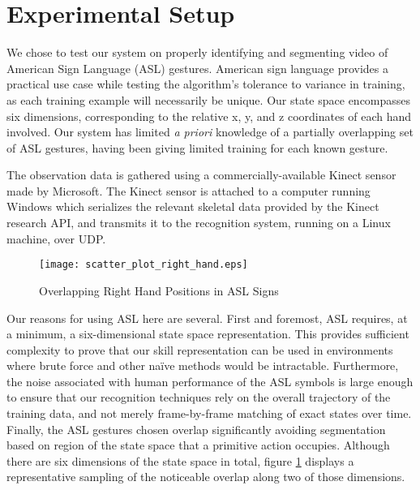 \documentclass[letterpaper]{article}
\begin{document}
\section{Experimental Setup}
\label{sec:experiment}
We chose to test our system on properly identifying and segmenting video of American Sign Language (ASL) gestures. American sign language provides a practical use case while testing the algorithm's tolerance to variance in training, as each training example will necessarily be unique. Our state space encompasses six dimensions, corresponding to the relative x, y, and z coordinates of each hand involved.  Our system has limited \textit{a priori} knowledge of a partially overlapping set of ASL gestures, having been giving limited training for each known gesture.

The observation data is gathered using a commercially-available Kinect sensor made by Microsoft.  The Kinect sensor is attached to a computer running Windows which serializes the relevant skeletal data provided by the Kinect research API, and transmits it to the recognition system, running on a Linux machine, over UDP.  

\begin{figure}
\begin{center}
\texttt{[image: scatter\_plot\_right\_hand.eps]}
\caption{Overlapping Right Hand Positions in ASL Signs}
\label{fig:asl_sign_overlap}
\end{center}
\end{figure}

Our reasons for using ASL here are several.  First and foremost, ASL requires, at a minimum, a six-dimensional state space representation.  This provides sufficient complexity to prove that our skill representation can be used in environments where brute force and other na\"ive methods would be intractable.  Furthermore, the noise associated with human performance of the ASL symbols is large enough to ensure that our recognition techniques rely on the overall trajectory of the training data, and not merely frame-by-frame matching of exact states over time.  Finally, the ASL gestures chosen overlap significantly avoiding segmentation based on region of the state space that a primitive action occupies. Although there are six dimensions of the state space in total, figure \ref{fig:asl_sign_overlap} displays a representative sampling of the noticeable overlap along two of those dimensions.
\end{document}
